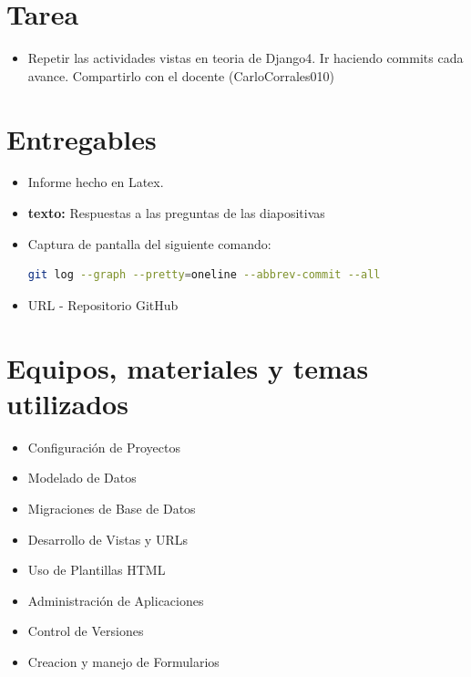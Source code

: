 \documentclass{article}
\begin{document}
 
	\section{Tarea}
  \begin{itemize}
    \item Repetir las actividades vistas en teoria de Django4.  Ir haciendo commits cada avance.  Compartirlo con el docente (CarloCorrales010)
  \end{itemize}
  
 
  \section{Entregables}
  \begin{itemize}
    \item Informe hecho en Latex.
    \item \textbf{texto: }Respuestas a las preguntas de las diapositivas 
    \item Captura de pantalla del siguiente comando:
    \begin{lstlisting}[language=bash]
      git log --graph --pretty=oneline --abbrev-commit --all
    \end{lstlisting}
    \item URL - Repositorio GitHub
  \end{itemize}
  
		
	\section{Equipos, materiales y temas utilizados}
  \begin{itemize}
    \item Configuración de Proyectos
    \item Modelado de Datos
    \item Migraciones de Base de Datos
    \item Desarrollo de Vistas y URLs
    \item Uso de Plantillas HTML
    \item Administración de Aplicaciones
    \item Control de Versiones
    \item Creacion y manejo de Formularios
  \end{itemize}

\end{document}
